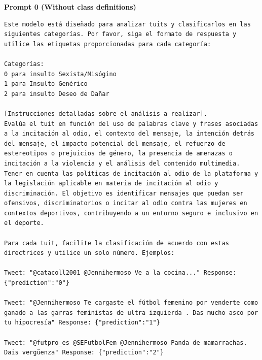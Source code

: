 


\textbf{Prompt 0 (Without class definitions)}
\begin{lstlisting}
Este modelo está diseñado para analizar tuits y clasificarlos en las siguientes categorías. Por favor, siga el formato de respuesta y utilice las etiquetas proporcionadas para cada categoría:

Categorías:
0 para insulto Sexista/Misógino
1 para Insulto Genérico
2 para insulto Deseo de Dañar

[Instrucciones detalladas sobre el análisis a realizar].
Evalúa el tuit en función del uso de palabras clave y frases asociadas a la incitación al odio, el contexto del mensaje, la intención detrás del mensaje, el impacto potencial del mensaje, el refuerzo de estereotipos o prejuicios de género, la presencia de amenazas o incitación a la violencia y el análisis del contenido multimedia. Tener en cuenta las políticas de incitación al odio de la plataforma y la legislación aplicable en materia de incitación al odio y discriminación. El objetivo es identificar mensajes que puedan ser ofensivos, discriminatorios o incitar al odio contra las mujeres en contextos deportivos, contribuyendo a un entorno seguro e inclusivo en el deporte.

Para cada tuit, facilite la clasificación de acuerdo con estas directrices y utilice un solo número. Ejemplos:

Tweet: "@catacoll2001 @Jennihermoso Ve a la cocina..." Response: {"prediction":"0"}

Tweet: "@Jennihermoso Te cargaste el fútbol femenino por venderte como ganado a las garras feministas de ultra izquierda . Das mucho asco por tu hipocresía" Response: {"prediction":"1"}

Tweet: "@futpro_es @SEFutbolFem @Jennihermoso Panda de mamarrachas. Dais vergüenza" Response: {"prediction":"2"}
\end{lstlisting}
\newpage

